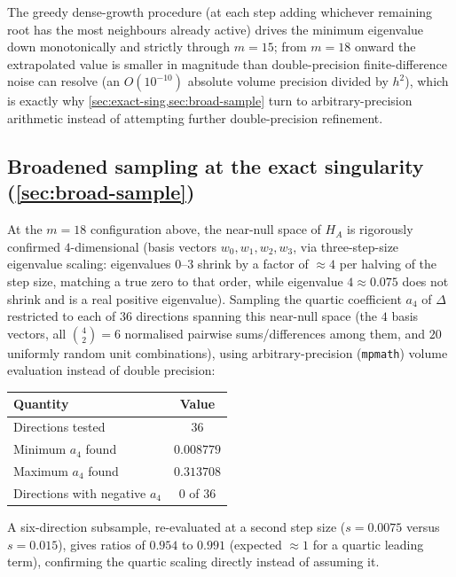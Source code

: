\documentclass[11pt,reqno]{amsart}
\renewcommand{\_}{\origunderscore\allowbreak}
\numberwithin{equation}{section}
\theoremstyle{plain}
\theoremstyle{definition}
\theoremstyle{remark}
\newcommand{\defect}{\Delta}                 %
\begin{document}
The greedy dense-growth procedure (at each step adding whichever
remaining root has the most neighbours already active) drives the
minimum eigenvalue down monotonically and strictly through $m=15$; from
$m=18$ onward the extrapolated value is smaller in magnitude than
double-precision finite-difference noise can resolve (an $O(10^{-10})$
absolute volume precision divided by $h^2$), which is exactly why
\cref{sec:exact-sing,sec:broad-sample} turn to arbitrary-precision
arithmetic instead of attempting further double-precision refinement.

\subsection{Broadened sampling at the exact singularity (\cref{sec:broad-sample})}

At the $m=18$ configuration above, the near-null space of $H_A$ is
rigorously confirmed $4$-dimensional (basis vectors $w_0,w_1,w_2,w_3$,
via three-step-size eigenvalue scaling: eigenvalues $0$--$3$ shrink by
a factor of $\approx4$ per halving of the step size, matching a
true zero to that order, while eigenvalue $4\approx0.075$ does not
shrink and is a real positive eigenvalue). Sampling the quartic
coefficient $a_4$ of $\defect$ restricted to each of $36$ directions
spanning this near-null space (the $4$ basis vectors, all $\binom42=6$
normalised pairwise sums/differences among them, and $20$ uniformly
random unit combinations), using arbitrary-precision (\texttt{mpmath})
volume evaluation instead of double precision:
\begin{center}
\begin{tabular}{lc}
\toprule
Quantity & Value\\
\midrule
Directions tested & $36$\\
Minimum $a_4$ found & $0.008779$\\
Maximum $a_4$ found & $0.313708$\\
Directions with negative $a_4$ & $0$ of $36$\\
\bottomrule
\end{tabular}
\end{center}
A six-direction subsample, re-evaluated at a second step size
($s=0.0075$ versus $s=0.015$), gives ratios of $0.954$ to $0.991$
(expected $\approx1$ for a quartic leading term), confirming
the quartic scaling directly instead of assuming it.
\end{document}
